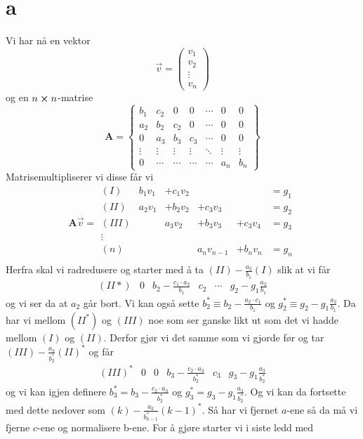 \documentclass[english,notitlepage]{revtex4-1}  %
\begin{document}
\section*{a}
Vi har nå en vektor
$$
\vec{v}=\begin{pmatrix}
v_1 \\ v_2 \\ \vdots \\ v_n
\end{pmatrix}
$$
og en $n\cross n$-matrise
$$
\textbf{A}=\begin{Bmatrix}
b_1 & c_2 & 0 & 0 & \cdots & 0 &0 \\
a_2 & b_2 & c_2 & 0 & \cdots &0 &0 \\
0 & a_3 & b_3 & c_3 & \cdots & 0 &0 \\
\vdots & \vdots&\vdots&\vdots&\ddots & \vdots & \vdots\\
0& \cdots &  \cdots&\cdots&\cdots& a_n & b_n
\end{Bmatrix}
$$
Matrisemultipliserer vi disse får vi
$$
\textbf{A}\vec{v}=
\begin{matrix}
(I)&b_1 v_1 &+ c_1 v_2 & &&=g_1 \\
(II) &a_2 v_1&+b_2v_2&+c_3 v_3 &&=g_2\\
(III)& & a_3v_2 &+b_3v_3 &+ c_3 v_4 &=g_3\\
\vdots&&&&&\\
(n)&&&a_n v_{n-1}&+b_n v_n&=g_n\\

\end{matrix}
$$ Herfra skal vi radredusere og starter med å ta $(II)-\frac{a_2}{b_1}(I)$ slik at vi får $$\begin{matrix}
(II*) & 0&b_2-\frac{c_1\cdot a_2}{b_1}& c_2 &\cdots & g_2-g_1\frac{a_2}{b_1}
\end{matrix}$$
og vi ser da at $a_2$ går bort. Vi kan også sette $b_2^*\equiv b_2-\frac{a_2 \cdot c_1}{b_1}$ og $g_2^*\equiv g_2-g_1\frac{a_2}{b_1}$. Da har vi mellom $(II^*)$ og $(III)$ noe som ser ganske likt ut som det vi hadde mellom $(I)$ og $(II)$. Derfor gjør vi det samme som vi gjorde før og tar $(III)-\frac{a_3}{b_2^*}(II)^*$ og får
$$
\begin{matrix}
(III)^* & 0 &0& b_3-\frac{c_2\cdot a_3}{b_2^*}&c_3 & g_3-g_1\frac{a_3}{b_2^*}
\end{matrix}
$$
og vi kan igjen definere $b_3^*=b_3-\frac{c_2\cdot a_3}{b_2^*}$ og $g_3^*=g_3-g_1\frac{a_3}{b_2^*}$. Og vi kan da fortsette med dette nedover som $(k)-\frac{a_{k}}{b_{k-1}^*}(k-1)^*$. Så har vi fjernet $a$-ene så da må vi fjerne $c$-ene og normalisere b-ene. For å gjøre starter vi i siste ledd med
\end{document}
